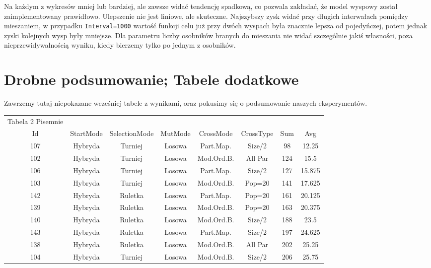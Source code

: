 \documentclass{article}
\begin{document}
Na każdym z wykresów mniej lub bardziej, ale zawsze widać tendencję spadkową, co pozwala zakładać, że model wyspowy został zaimplementowany prawidłowo. Ulepszenie nie jest liniowe, ale skuteczne. Najszybszy zysk widać przy długich interwałach pomiędzy mieszaniem, w przypadku \texttt{Interval=1000} wartość funkcji celu już przy dwóch wyspach była znacznie lepsza od pojedyńczej, potem jednak zyski kolejnych wysp były mniejsze. Dla parametru liczby osobników branych do mieszania nie widać szczególnie jakiś własności, poza nieprzewidywalnością wyniku, kiedy bierzemy tylko po jednym z osobników.


\section{Drobne podsumowanie; Tabele dodatkowe}
Zawrzemy tutaj niepokazane wcześniej tabele z wynikami, oraz pokusimy się o podsumowanie naszych eksperymentów.

\begin{table}[h!]
	\centering
	\begin{tabular}{c||c|c|c|c|c||c|c}
Tabela 2 Pisemnie\\
Id & StartMode & SelectionMode & MutMode & CrossMode & CrossType & Sum & Avg \\
\hline
107 & Hybryda & Turniej & Losowa & Part.Map. & Size/2 & 98 & 12.25 \\
102 & Hybryda & Turniej & Losowa & Mod.Ord.B. & All Par & 124 & 15.5 \\
106 & Hybryda & Turniej & Losowa & Part.Map. & Size/2 & 127 & 15.875 \\
103 & Hybryda & Turniej & Losowa & Mod.Ord.B. & Pop=20 & 141 & 17.625 \\
142 & Hybryda & Ruletka & Losowa & Part.Map. & Pop=20 & 161 & 20.125 \\
139 & Hybryda & Ruletka & Losowa & Mod.Ord.B. & Pop=20 & 163 & 20.375 \\
140 & Hybryda & Ruletka & Losowa & Mod.Ord.B. & Size/2 & 188 & 23.5 \\
143 & Hybryda & Ruletka & Losowa & Part.Map. & Size/2 & 197 & 24.625 \\
138 & Hybryda & Ruletka & Losowa & Mod.Ord.B. & All Par & 202 & 25.25 \\
104 & Hybryda & Turniej & Losowa & Mod.Ord.B. & Size/2 & 206 & 25.75 \\
	\end{tabular}
\end{table}
\end{document}
